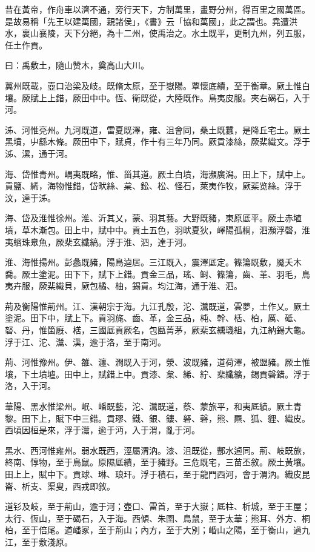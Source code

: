 
\begin{pinyinscope}
昔在黃帝，作舟車以濟不通，旁行天下，方制萬里，畫野分州，得百里之國萬區。是故易稱「先王以建萬國，親諸侯」，《書》云「協和萬國」，此之謂也。堯遭洪水，褱山襄陵，天下分絕，為十二州，使禹治之。水土既平，更制九州，列五服，任土作貢。

曰：禹敷土，隨山赞木，奠高山大川。

冀州既載，壺口治梁及岐。既脩太原，至于嶽陽。覃懷底績，至于衡章。厥土惟白壤。厥賦上上錯，厥田中中。恆、衛既從，大陸既作。鳥夷皮服。夾右碣石，入于河。

泲、河惟兗州。九河既道，雷夏既澤，雍、沮會同，桑土既蠶，是降丘宅土。厥土黑墳，屮繇木條。厥田中下，賦貞，作十有三年乃同。厥貢漆絲，厥棐織文。浮于泲、漯，通于河。

海、岱惟青州。嵎夷既略，惟、甾其道。厥土白墳，海瀕廣潟。田上下，賦中上。貢鹽、絺，海物惟錯，岱畎絲、枲、鈆、松、怪石，萊夷作牧，厥棐览絲。浮于汶，達于泲。

海、岱及淮惟徐州。淮、沂其乂，蒙、羽其藝。大野既豬，東原厎平。厥土赤埴墳，草木漸包。田上中，賦中中。貢土五色，羽畎夏狄，嶧陽孤桐，泗瀕浮磬，淮夷蠙珠臮魚，厥棐玄纖縞。浮于淮、泗，達于河。

淮、海惟揚州。彭蠡既豬，陽鳥逌居。三江既入，震澤厎定。篠簜既敷，魇夭木喬。厥土塗泥。田下下，賦下上錯。貢金三品，瑤、鲥、篠簜，齒、革、羽毛，鳥夷卉服，厥棐織貝，厥包橘、柚，錫貢。均江海，通于淮、泗。

荊及衡陽惟荊州。江、漢朝宗于海。九江孔殷，沱、灊既道，雲夢，土作乂。厥土塗泥。田下中，賦上下。貢羽旄、齒、革，金三品，杶、幹、栝、柏，厲、砥、砮、丹，惟箘廐、楛，三國厎貢厥名，包匭菁茅，厥棐玄纁璣組，九江納錫大龜。浮于江、沱、灊、漢，逾于洛，至于南河。

荊、河惟豫州。伊、雒、瀍、澗既入于河，滎、波既豬，道荷澤，被盟豬。厥土惟壤，下土墳壚。田中上，賦錯上中。貢漆、枲、絺、紵、棐纖纊，錫貢磬錯。浮于洛，入于河。

華陽、黑水惟梁州。岷、嶓既藝，沱、灊既道，蔡、蒙旅平，和夷厎績。厥土青黎。田下上，賦下中三錯。貢璆、鐵、銀、鏤、砮、磬，熊、羆、狐、貍、織皮。西頃因桓是來，浮于灊，逾于沔，入于渭，亂于河。

黑水、西河惟雍州。弱水既西，涇屬渭汭。漆、沮既從，酆水逌同。荊、岐既旅，終南、惇物，至于鳥鼠。原隰厎績，至于豬野。三危既宅，三苗丕敘。厥土黃壤。田上上，賦中下。貢球、琳、琅玕。浮于積石，至于龍門西河，會于渭汭。織皮昆崙、析支、渠叟，西戎即敘。

道钐及岐，至于荊山，逾于河；壺口、雷首，至于大嶽；厎柱、析城，至于王屋；太行、恆山，至于碣石，入于海。西傾、朱圉、鳥鼠，至于太華；熊耳、外方、桐柏，至于倍尾。道嶓冢，至于荊山；內方，至于大別；崏山之陽，至于衡山，過九江，至于敷淺原。


\end{pinyinscope}
